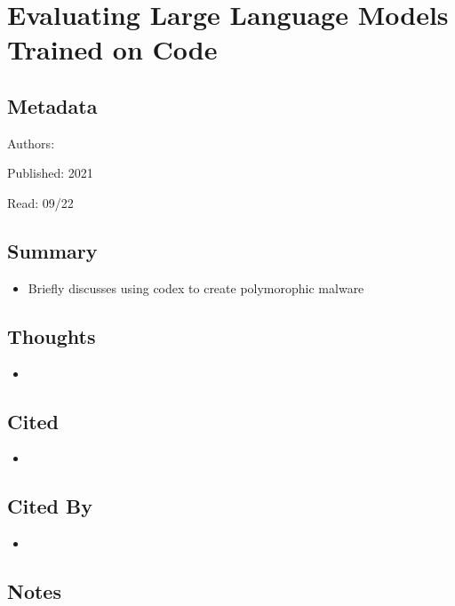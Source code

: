 \documentclass{article}
\begin{document}
\pagebreak


\section*{Evaluating Large Language Models Trained on Code}

\subsection*{Metadata}

\noindent Authors: 

\noindent Published: 2021

\noindent Read: 09/22

\subsection*{Summary}
\begin{itemize}
	\item Briefly discusses using codex to create polymorophic malware
\end{itemize}

\subsection*{Thoughts}
\begin{itemize}
	\item
\end{itemize}

\subsection*{Cited}
\begin{itemize}
	\item
\end{itemize}

\subsection*{Cited By}
\begin{itemize}
	\item
\end{itemize}

\subsection*{Notes}
\end{document}
